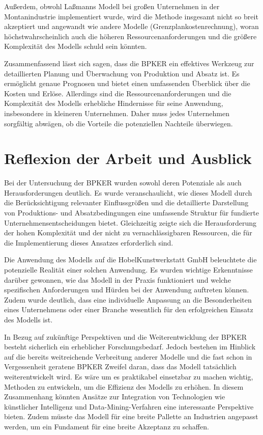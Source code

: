 Au{\ss}erdem, obwohl La{\ss}manns Modell bei gro{\ss}en Unternehmen in der Montanindustrie implementiert wurde, wird die Methode insgesamt nicht so breit akzeptiert und angewandt wie andere Modelle (Grenzplankostenrechnung), woran höchstwahrscheinlich auch die höheren Ressourcenanforderungen und die grö{\ss}ere Komplexität des Modells schuld sein könnten.

Zusammenfassend lässt sich sagen, dass die BPKER ein effektives Werkzeug zur detaillierten Planung und Überwachung von Produktion und Absatz ist. Es ermöglicht genaue Prognosen und bietet einen umfassenden Überblick über die Kosten und Erlöse. Allerdings sind die Ressourcenanforderungen und die Komplexität des Modells erhebliche Hindernisse für seine Anwendung, insbesondere in kleineren Unternehmen. Daher muss jedes Unternehmen sorgfältig abwägen, ob die Vorteile die potenziellen Nachteile überwiegen.

\section{Reflexion der Arbeit und Ausblick}

Bei der Untersuchung der BPKER wurden sowohl deren Potenziale als auch Herausforderungen deutlich. Es wurde veranschaulicht, wie dieses Modell durch die Berücksichtigung relevanter Einflussgrößen und die detaillierte Darstellung von Produktions- und Absatzbedingungen eine umfassende Struktur für fundierte Unternehmensentscheidungen bietet. Gleichzeitig zeigte sich die Herausforderung der hohen Komplexität und der nicht zu vernachlässigbaren Ressourcen, die für die Implementierung dieses Ansatzes erforderlich sind.

Die Anwendung des Modells auf die HobelKunstwerkstatt GmbH beleuchtete die potenzielle Realität einer solchen Anwendung. Es wurden wichtige Erkenntnisse darüber gewonnen, wie das Modell in der Praxis funktioniert und welche spezifischen Anforderungen und Hürden bei der Anwendung auftreten können. Zudem wurde deutlich, dass eine individuelle Anpassung an die Besonderheiten eines Unternehmens oder einer Branche wesentlich für den erfolgreichen Einsatz des Modells ist.

In Bezug auf zukünftige Perspektiven und die Weiterentwicklung der BPKER besteht sicherlich ein erheblicher Forschungsbedarf. Jedoch bestehen im Hinblick auf die bereits weitreichende Verbreitung anderer Modelle und die fast schon in Vergessenheit geratene BPKER Zweifel daran, dass das Modell tatsächlich weiterentwickelt wird. Es wäre um es praktikabel einsetzbar zu machen wichtig, Methoden zu entwickeln, um die Effizienz des Modells zu erhöhen. In diesem Zusammenhang könnten Ansätze zur Integration von Technologien wie künstlicher Intelligenz und Data-Mining-Verfahren eine interessante Perspektive bieten. Zudem müsste das Modell für eine breite Pallette an Industrien angepasst werden, um ein Fundament für eine breite Akzeptanz zu schaffen. 

